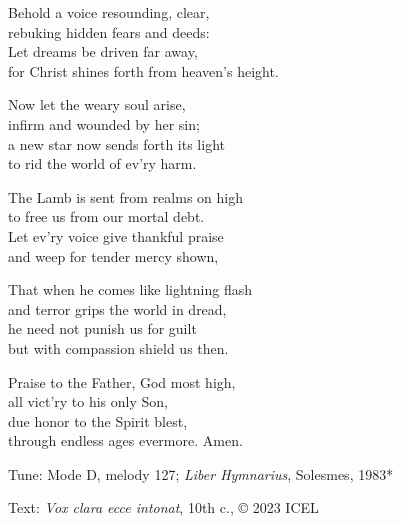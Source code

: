 \hymn

\settowidth{\versewidth}{for Christ shines forth from heaven’s height.}

\begin{hymnverse}[\versewidth]
Behold a voice resounding, clear,\\
rebuking hidden fears and deeds:\\
Let dreams be driven far away,\\
for Christ shines forth from heaven’s height.

Now let the weary soul arise,\\
infirm and wounded by her sin;\\
a new star now sends forth its light\\
to rid the world of ev’ry harm.

The Lamb is sent from realms on high\\
to free us from our mortal debt.\\
Let ev’ry voice give thankful praise\\
and weep for tender mercy shown,

That when he comes like lightning flash\\
and terror grips the world in dread,\\
he need not punish us for guilt\\
but with compassion shield us then.

Praise to the Father, God most high,\\
all vict’ry to his only Son,\\
due honor to the Spirit blest,\\
through endless ages evermore. Amen.
\end{hymnverse}

\begin{hymnsource}
Tune: Mode D, melody 127; \emph{Liber Hymnarius}, Solesmes, 1983*

Text: \emph{Vox clara ecce intonat}, 10th c., © 2023 ICEL
\end{hymnsource}